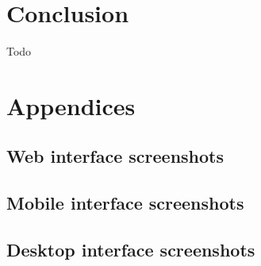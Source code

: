 \documentclass[a4paper,12pt, twocolumn]{article}
\begin{document}
\section*{Conclusion}
Todo



\section*{Appendices}

\appendix
\renewcommand{\thesubsection}{\thesection \Alph{subsection}}


\subsection{Web interface screenshots}


\subsection{Mobile interface screenshots}


\subsection{Desktop interface screenshots}
\end{document}
